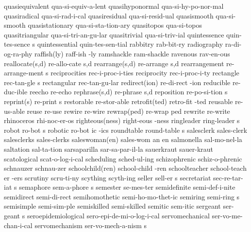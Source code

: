 \1 quasiequivalent	qua-si-equiv-a-lent	%
\1 quasihyponormal	qua-si-hy-po-nor-mal
\1 quasiradical 	qua-si-rad-i-cal
\1 quasiresidual	qua-si-resid-ual
\1 quasismooth		qua-si-smooth
\1 quasistationary	qua-si-sta-tion-ary
\1 quasitopos		qua-si-topos
\1 quasitriangular	qua-si-tri-an-gu-lar
\1 quasitrivial		qua-si-triv-ial		%
\5 quintessence		quin-tes-sence s
\1 quintessential	quin-tes-sen-tial
\1 rabbitry		rab-bit-ry
\1 radiography		ra-di-og-ra-phy
\2 raffish(ly)		raff-ish -ly
\1 ramshackle		ram-shackle
\1 ravenous		rav-en-ous
\2 reallocate(s,d)	re-allo-cate s,d	%
\2 rearrange(s,d)	re-arrange s,d		%
\5 rearrangement	re-arrange-ment s
\1 reciprocities	rec-i-proc-i-ties
\1 reciprocity		rec-i-proc-i-ty
\5 rectangle		rec-tan-gle s
\1 rectangular		rec-tan-gu-lar
\2 redirect(ion)	re-di-rect -ion		%
\1 reducible            re-duc-ible	%
\1 reecho		re-echo
\2 rephrase(s,d)	re-phrase s,d		%
\5 reposition		re-po-si-tion s		%
\2 reprint(s)		re-print s
\1 restorable		re-stor-able
\2 retrofit(ted)	retro-fit -ted
\1 reusable		re-us-able		%
\1 reuse		re-use			%
\1 rewire		re-wire 		%
\2 rewrap(ped)		re-wrap ped		%
\1 rewrite		re-write		%
\1 rhinoceros		rhi-noc-er-os
\2 righteous(ness)	right-eous -ness
\5 ringleader		ring-leader s
\5 robot		ro-bot s
\6 robotic		ro-bot ic -ics
\5 roundtable		round-table s
\1 salesclerk		sales-clerk
\1 salesclerks		sales-clerks
\3 saleswoman(en)	sales-wom an en
\1 salmonella		sal-mo-nel-la
\1 saltation		sal-ta-tion		%
\1 sarsaparilla		sar-sa-par-il-la
\1 sauerkraut		sauer-kraut
\1 scatological		scat-o-log-i-cal
\1 scheduling		sched-ul-ing
\1 schizophrenic	schiz-o-phrenic
\1 schnauzer		schnau-zer
\2 schoolchild(ren)	school-child -ren
\6 schoolteacher	school-teach er -ers
\1 scrutiny		scru-ti-ny		%
\1 scything		scyth-ing
\5 seller		sell-er s		%
\5 secretariat		sec-re-tar-iat s
\5 semaphore		sem-a-phore s
\1 semester		se-mes-ter
\1 semidefinite 	semi-def-i-nite
\1 semidirect		semi-di-rect		%
\1 semihomothetic	semi-ho-mo-thet-ic
\5 semiring		semi-ring s
\1 semisimple		semi-sim-ple		%
\1 semiskilled		semi-skilled
\1 semitic		sem-itic		%
\5 sergeant		ser-geant s		%
\1 seroepidemiological	sero-epi-de-mi-o-log-i-cal
\1 servomechanical	ser-vo-me-chan-i-cal	%
\5 servomechanism	ser-vo-mech-a-nism s
